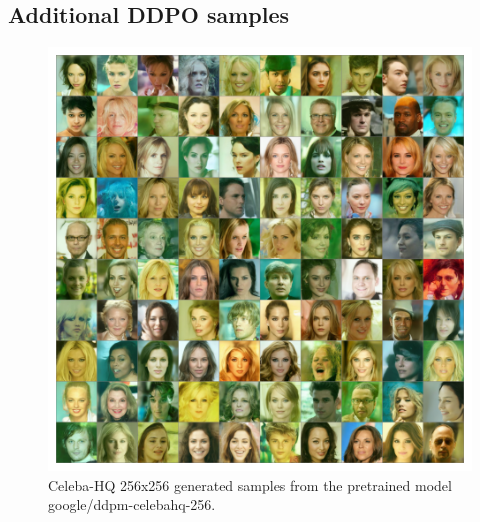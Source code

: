 \begin{appendixs}
	
	\section{Additional DDPO samples}\label{appendix:additional-samples}


        \begin{figure}[ht]
            \centering
            \includegraphics[scale=0.8]{img/results/ddpm-samples.png}
            \vspace{-4pt}  %
            \captionsetup{width=\textwidth} %
            \caption{Celeba-HQ 256x256 generated samples from the pretrained model google/ddpm-celebahq-256.}
            \label{fig:ddpm-samples}
        \end{figure}


\end{appendixs}
